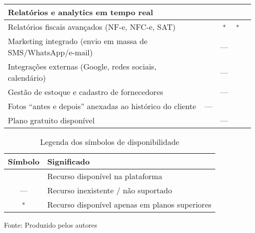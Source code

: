 \begin{quadro}[htb]
\begin{tabular}{|p{6.8cm}|c|c|c|c|}
		Relatórios e analytics em tempo real                                & \checkmark & \checkmark & \checkmark & \checkmark \\ \hline
		Relatórios fiscais avançados (NF-e, NFC-e, SAT)                     & \checkmark & \checkmark\textsuperscript{*} & \checkmark\textsuperscript{*} & \checkmark \\ \hline
		Marketing integrado (envio em massa de SMS/WhatsApp/e-mail)         & \checkmark & — & \checkmark & \checkmark \\ \hline
		Integrações externas (Google, redes sociais, calendário)            & \checkmark & — & \checkmark & \checkmark \\ \hline
		Gestão de estoque e cadastro de fornecedores                        & \checkmark & — & \checkmark & \checkmark \\ \hline
		Fotos “antes e depois” anexadas ao histórico do cliente             & — & \checkmark & \checkmark & \checkmark \\ \hline
		Plano gratuito disponível                                           & \checkmark & — & \checkmark & \checkmark \\ \hline
	\end{tabular}
\end{quadro}

\begin{table}[htb]
	\centering
	\caption{Legenda dos símbolos de disponibilidade}
	\label{tab:legenda_comparativo_concorrência}
	
	\begin{tabular}{|c|p{9cm}|}
		\hline
		\textbf{Símbolo} & \textbf{Significado} \\ \hline
		\checkmark       & Recurso disponível na plataforma \\ \hline
		—                & Recurso inexistente / não suportado \\ \hline
		\textsuperscript{*} & Recurso disponível apenas em planos superiores \\ \hline
	\end{tabular}
	
	\vspace{0.5em}
	{\footnotesize Fonte: Produzido pelos autores\par}
\end{table}


